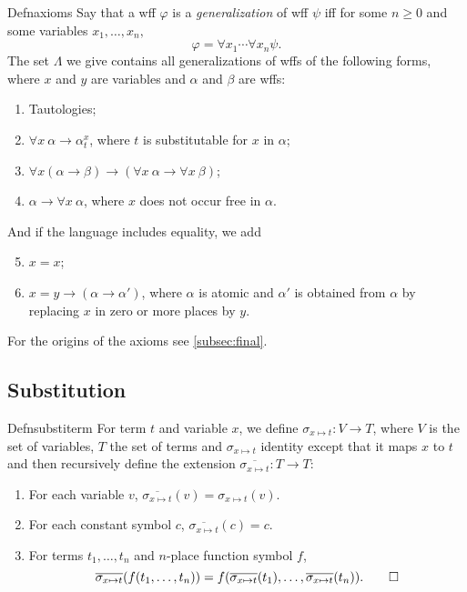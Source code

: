 \begin{reference}{Defn}{axioms}
  Say that a wff $\varphi$ is a \textit{generalization} of wff $\psi$ iff for some $n\geq 0$ and some variables $x_1,\dots,x_n,$
  \[
    \varphi=\forall x_1\cdots\forall x_n \psi.
  \]
  The set $\Lambda$ we give contains all generalizations of wffs of the following forms, where $x$ and $y$ are variables and $\alpha$ and $\beta$ are wffs:
  \begin{enumerate}
    \item Tautologies;
    \item $\forall x\ \alpha\rightarrow \alpha_t^x$, where $t$ is substitutable for $x$ in $\alpha$;
    \item $\forall x(\alpha\rightarrow \beta)\rightarrow(\forall x\ \alpha\rightarrow\forall x\ \beta)$;
    \item $\alpha\rightarrow\forall x\ \alpha$, where $x$ does not occur free in $\alpha$.
  \end{enumerate}
  And if the language includes equality, we add
  \begin{enumerate}
    \setcounter{enumi}{4}
    \item $x=x$;
    \item $x=y\rightarrow(\alpha\rightarrow \alpha')$, where $\alpha$ is atomic and $\alpha'$ is obtained from $\alpha$ by replacing $x$ in zero or more places by $y$.\qedhere
  \end{enumerate}
\end{reference}

For the origins of the axioms see \ref{subsec:final}.

\subsection*{Substitution}\label{subsec:substitution}

\begin{reference}{Defn}{substiterm}
  For term $t$ and variable $x$, we define $\sigma_{x\mapsto t}:V\rightarrow T$, where $V$ is the set of variables, $T$ the set of terms and $\sigma_{x\mapsto t}$ identity except that it maps $x$ to $t$ and then recursively define the extension $\overline{\sigma_{x\mapsto t}}:T\rightarrow T$:
  \begin{enumerate}
    \item For each variable $v$, $\overline{\sigma_{x\mapsto t}}(v)=\sigma_{x\mapsto t}(v)$.
    \item For each constant symbol $c$, $\overline{\sigma_{x\mapsto t}}(c)=c$.
    \item For terms $t_1,\dots,t_n$ and $n$-place function symbol $f$,
          \[\overline{\sigma_{x\mapsto t}}(f(t_1,\dots,t_n))=f(\overline{\sigma_{x\mapsto t}}(t_1),\dots,\overline{\sigma_{x\mapsto t}}(t_n)).\qedhere\]
  \end{enumerate}
\end{reference}

